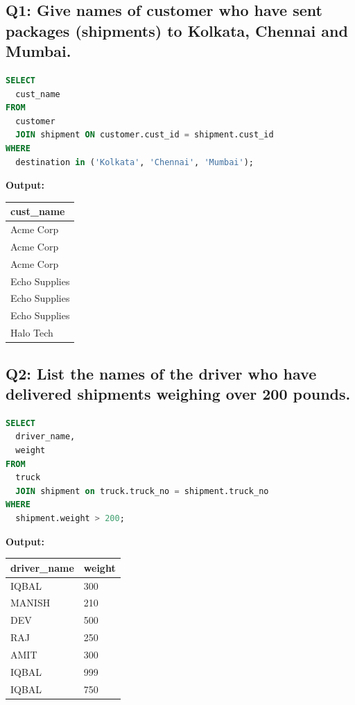 \documentclass[11pt, a4paper]{article}
\begin{document}
\subsection*{Q1: Give names of customer who have sent packages (shipments) to Kolkata, Chennai and Mumbai.}
\begin{lstlisting}[language=SQL]
SELECT
  cust_name
FROM
  customer
  JOIN shipment ON customer.cust_id = shipment.cust_id
WHERE
  destination in ('Kolkata', 'Chennai', 'Mumbai');
\end{lstlisting}
\vspace{0.3cm}
\textbf{Output:}\vspace{0.2cm}
\begin{center}
\begin{tabular}{|l|}
\hline
\textbf{cust\_name} \\ \hline
Acme Corp \\ \hline
Acme Corp \\ \hline
Acme Corp \\ \hline
Echo Supplies \\ \hline
Echo Supplies \\ \hline
Echo Supplies \\ \hline
Halo Tech \\ \hline
\end{tabular}
\end{center}
\newpage
\subsection*{Q2: List the names of the driver who have delivered shipments weighing over 200 pounds.}
\begin{lstlisting}[language=SQL]
SELECT
  driver_name,
  weight
FROM
  truck
  JOIN shipment on truck.truck_no = shipment.truck_no
WHERE
  shipment.weight > 200;
\end{lstlisting}
\vspace{0.3cm}
\textbf{Output:}\vspace{0.2cm}
\begin{center}
\begin{tabular}{|l|l|}
\hline
\textbf{driver\_name} & \textbf{weight} \\ \hline
IQBAL & 300 \\ \hline
MANISH & 210 \\ \hline
DEV & 500 \\ \hline
RAJ & 250 \\ \hline
AMIT & 300 \\ \hline
IQBAL & 999 \\ \hline
IQBAL & 750 \\ \hline
\end{tabular}
\end{center}
\newpage
\end{document}
